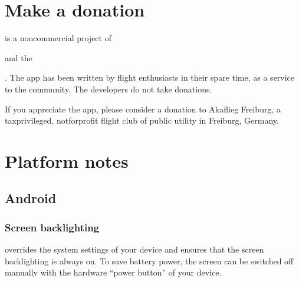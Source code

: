 \documentclass[letterpaper,10pt,english]{sphinxmanual}
\begin{document}
\chapter{Make a donation}
\label{\detokenize{02-steps/donate:make-a-donation}}\label{\detokenize{02-steps/donate::doc}}
\sphinxAtStartPar
{} is a non\sphinxhyphen{}commercial project of %
\begin{footnote}[18]\sphinxAtStartFootnote
{}
%
\end{footnote} and the %
\begin{footnote}[19]\sphinxAtStartFootnote
{}
%
\end{footnote}. The app has been written by flight enthusiasts
in their spare time, as a service to the community. The developers do not take
donations.

\sphinxAtStartPar
If you appreciate the app, please consider a donation to Akaflieg Freiburg, a
tax\sphinxhyphen{}privileged, not\sphinxhyphen{}for\sphinxhyphen{}profit flight club of public utility in Freiburg,
Germany.

\begin{sphinxVerbatim}[commandchars=\\\{\}]
         
     
     
   
\end{sphinxVerbatim}


\chapter{Platform notes}
\label{\detokenize{03-reference/platform:platform-notes}}\label{\detokenize{03-reference/platform::doc}}

\section{Android}
\label{\detokenize{03-reference/platform:android}}

\subsection{Screen backlighting}
\label{\detokenize{03-reference/platform:screen-backlighting}}
\sphinxAtStartPar
{} overrides the system settings of your device and
ensures that the screen backlighting is always on.  To save battery power, the
screen can be switched off manually with the hardware “power button” of your
device.
\end{document}
